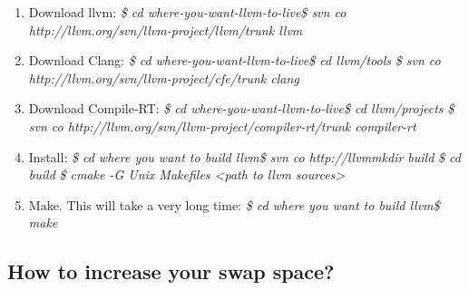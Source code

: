     \begin{enumerate}
        \item Download llvm:\newline
        \textit{\$ cd where-you-want-llvm-to-live}\newline \textit{\$ svn co http://llvm.org/svn/llvm-project/llvm/trunk llvm}\newline
        
        \item Download Clang:\newline
        \textit{\$ cd where-you-want-llvm-to-live}\newline \textit{\$ cd llvm/tools}\newline
        \textit{\$ svn co http://llvm.org/svn/llvm-project/cfe/trunk clang}\newline
        
        \item Download Compile-RT:\newline
        \textit{\$ cd where-you-want-llvm-to-live}\newline \textit{\$ cd llvm/projects}\newline
        \textit{\$ svn co http://llvm.org/svn/llvm-project/compiler-rt/trunk compiler-rt}\newline
        
        \item Install:\newline
        \textit{\$ cd where you want to build llvm}\newline \textit{\$ svn co http://llvmmkdir build}\newline
        \textit{\$ cd build}\newline
        \textit{\$ cmake -G Unix Makefiles <path to llvm sources>}\newline
        
        \item Make. This will take a very long time:\newline
        \textit{\$ cd where you want to build llvm}\newline \textit{\$ make}\newline

    \end{enumerate}


\subsection{How to increase your swap space?}

